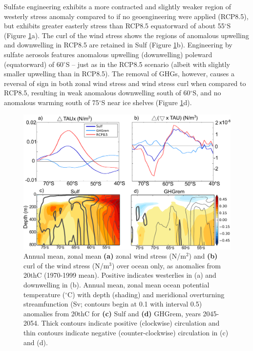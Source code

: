 \documentclass[draft,grl]{AGUTeX}  %
\begin{document}
\begin{article}
Sulfate engineering exhibits a more contracted and slightly weaker region of westerly stress anomaly compared to if no geoengineering were applied (RCP8.5), but exhibits greater easterly stress than RCP8.5 equatorward of about 55$^\circ$S (Figure \ref{fig:zmtautemp}a). The curl of the wind stress shows the regions of anomalous upwelling and downwelling in RCP8.5 are retained in Sulf (Figure \ref{fig:zmtautemp}b). Engineering by sulfate aerosols features anomalous upwelling (downwelling) poleward (equatorward) of 60$^\circ$S -- just as in the RCP8.5 scenario (albeit with slightly smaller upwelling than in RCP8.5). The removal of GHGs, however, causes a reversal of sign in both zonal wind stress and wind stress curl when compared to RCP8.5, resulting in weak anomalous downwelling south of 60$^\circ$S, and no anomalous warming south of 75$^\circ$S near ice shelves (Figure \ref{fig:zmtautemp}d). %

\begin{figure}[htbp] %
\centering
 \noindent\includegraphics[width=35pc]{figures/TAUcurl_TEMPanomMOCeddy+eul.pdf}
\caption{Annual mean, zonal mean \textbf{(a)} zonal wind stress (N/m$^2$) and \textbf{(b)} curl of the wind stress (N/m$^3$) over ocean only, as anomalies from 20thC (1970-1999 mean). Positive indicates westerlies in (a) and downwelling in (b). Annual mean, zonal mean ocean potential temperature ($^\circ$C) with depth (shading) and meridional overturning streamfunction (Sv; contours begin at 0.1 with interval 0.5) anomalies from 20thC for \textbf{(c)} Sulf and \textbf{(d)} GHGrem, years 2045-2054. Thick contours indicate positive (clockwise) circulation and thin contours indicate negative (counter-clockwise) circulation in (c) and (d).}
\label{fig:zmtautemp}
\end{figure}


\end{article}
\end{document}
